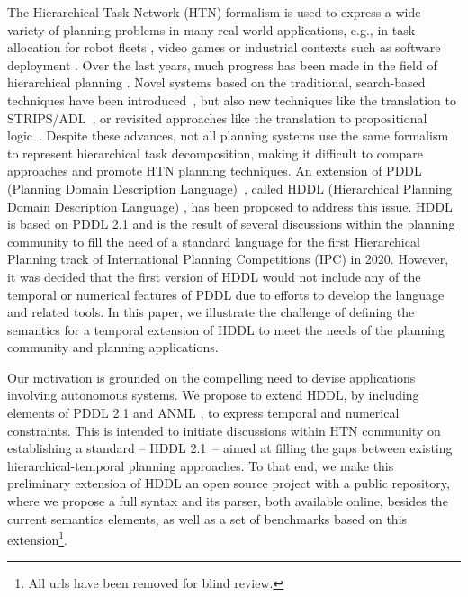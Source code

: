 \documentclass[letterpaper]{article} %
\begin{document}
The Hierarchical Task Network (HTN) formalism \citep{erol94} is used to express a wide variety of planning problems in many real-world applications, e.g., in task allocation for robot fleets \citep{Milot21}, video games \citep{Menif14} or industrial contexts such as software deployment \citep{Georgievski17}. Over the last years, much progress has been made in the field of hierarchical planning \citep{bercher19}. Novel systems based on the traditional, search-based techniques have been introduced~\citep{Bit-Monnot:16,ramoul17,Shivashankar17,Bercher17,Holler19,holler20,Holler21}, but also new techniques like the translation to STRIPS/ADL~\citep{Alford09,Alford16,behnke2022}, or revisited approaches like the translation to propositional logic~\citep{behnke2018totsat,Behnke2019orderchaos,Schreiber2019SAT,Schreiber21,behnke2021}. Despite these advances, not all planning systems use the same formalism to represent hierarchical task decomposition, making it difficult to compare approaches and promote HTN planning techniques. %
An extension of PDDL (Planning Domain Description Language)~\citep{mcdermott98}, called HDDL (Hierarchical Planning Domain Description Language) \citep{holler20}, has been proposed to address this issue. HDDL is based on PDDL 2.1 \citep{fox03} and is the result of several discussions within the planning community \citep{Holler19b} to fill the need of a standard language for the first Hierarchical Planning track of International Planning Competitions (IPC) in 2020. However, it was decided that the first version of HDDL would not include any of the temporal or numerical features of PDDL due to efforts to develop the language and related tools. In this paper, we illustrate the challenge of defining the semantics for a temporal extension of HDDL to meet the needs of the planning community and planning applications. %

Our motivation is grounded on the compelling need to devise applications involving autonomous systems. %
We propose to extend HDDL, by including elements of PDDL 2.1 and ANML \citep{smith08}, to express temporal and numerical constraints.
This is intended to initiate discussions within HTN community on establishing a standard -- HDDL 2.1~-- aimed at filling the gaps between existing hierarchical-temporal planning approaches. To that end, we make this preliminary extension of HDDL an open source project with a public repository, where we propose a full syntax and its parser, both available online, besides the current semantics elements, as well as a set of benchmarks based on this extension\footnote{All urls have been removed for blind review.}.
\end{document}
